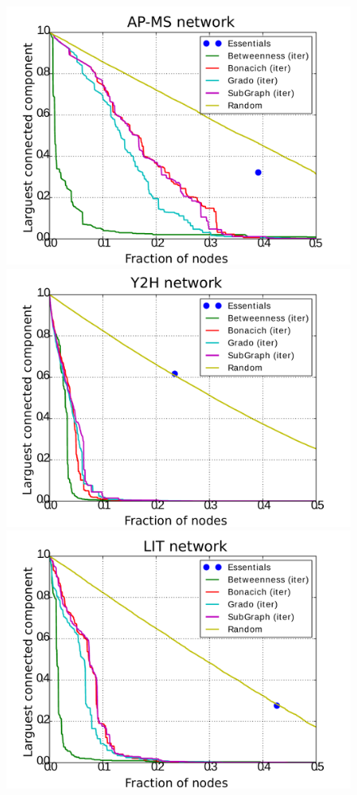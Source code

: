 \begin{figure}
\centering
\includegraphics[scale = 0.3]{figuras/AP-MS-eps-converted-to} 
\includegraphics[scale = 0.3]{figuras/Y2H-eps-converted-to} \\
\includegraphics[scale = 0.3]{figuras/LIT-eps-converted-to} 

\end{figure}
